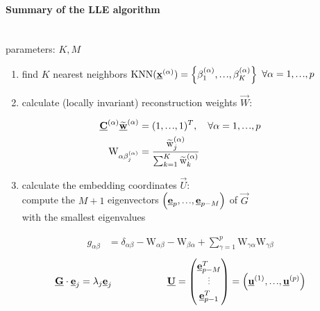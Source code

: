 \paragraph{Summary of the LLE algorithm}\mbox{}\\
parameters: $K,M$
\begin{enumerate}
	\item find $K$ nearest neighbors $\operatorname{KNN}(\vec{x}^{(\alpha)}) = \left\{ \beta_1^{(\alpha)}, \mydots, \beta_K^{(\alpha)} \right\}$ $\forall \alpha=1, \mydots, p$
	\item calculate (locally invariant) reconstruction weights $\vec{W}$:
\end{enumerate}
\vspace{-0.1cm}
\begin{align*}
\vec{C}^{(\alpha)}\widetilde{\vec{w}}^{(\alpha)} &= (1, \mydots, 1)^T, \quad \forall \alpha=1, \mydots, p \\
\mathrm{W}_{\alpha \beta_j^{(\alpha)}} &= \frac{\widetilde{\mathrm{w}}_j^{(\alpha)}}{\sum_{k=1}^{K} \widetilde{\mathrm{w}}_k^{(\alpha)}}
\end{align*}
\vspace{-0.2cm}
\begin{enumerate}
	\setcounter{enumi}{2}
	\item calculate the embedding coordinates $\vec{U}$: \\\vspace{0.1cm}
	compute the $M+1$ eigenvectors $\left( \vec{e}_p, \mydots, \vec{e}_{p-M} \right)$ of  $\vec{G}$ \\with the smallest eigenvalues
\end{enumerate}
\vspace{-0.2cm}
\begin{align*}
 g_{\alpha \beta} &= \delta_{\alpha \beta} - \mathrm{W}_{\alpha \beta} - \mathrm{W}_{\beta \alpha} + \sum_{\gamma=1}^{p} \mathrm{W}_{\gamma \alpha} \mathrm{W}_{\gamma \beta} 
\end{align*}
\vspace{-0.2cm}
\begin{align*}
 \vec{G} \cdot \vec{e}_j = \lambda_j \vec{e}_j \hspace{2cm}
\vec{U} = \begin{pmatrix}
\vec{e}_{p-M}^T \\ \myvdots \\ \vec{e}_{p-1}^T
\end{pmatrix} = \left(\vec{u}^{(1)}, \mydots, \vec{u}^{(p)}\right)
\end{align*}

